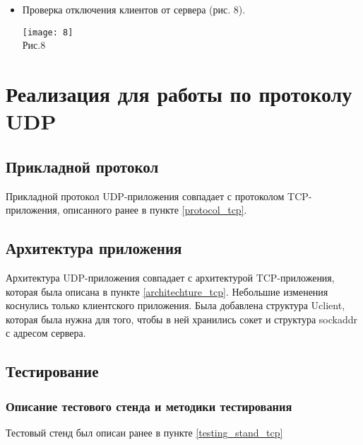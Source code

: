 \documentclass[12pt,a4paper]{report}
\begin{document}
\begin{enumerate}
\begin{itemize}
\item Проверка отключения клиентов от сервера (рис. 8).
\begin{center}
\texttt{[image: 8]}\\
Рис.8\\
\end{center}
		\end{itemize}
\end{enumerate}
\chapter{Реализация для работы по протоколу UDP}
\section{Прикладной протокол}

Прикладной протокол UDP-приложения совпадает с протоколом TCP-приложения, описанного ранее в пункте \ref{protocol_tcp}.

\section{Архитектура приложения}
Архитектура UDP-приложения совпадает с архитектурой TCP-приложения, которая была описана в пункте \ref{architechture_tcp}.	
Небольшие изменения коснулись только клиентского приложения. Была добавлена структура Uclient, которая была нужна для того, чтобы в ней хранились сокет и структура sockaddr с адресом сервера. 

\section{Тестирование}
\subsection{Описание тестового стенда и методики тестирования}
Тестовый стенд был описан ранее в пункте \ref{testing_stand_tcp}
\end{document}

